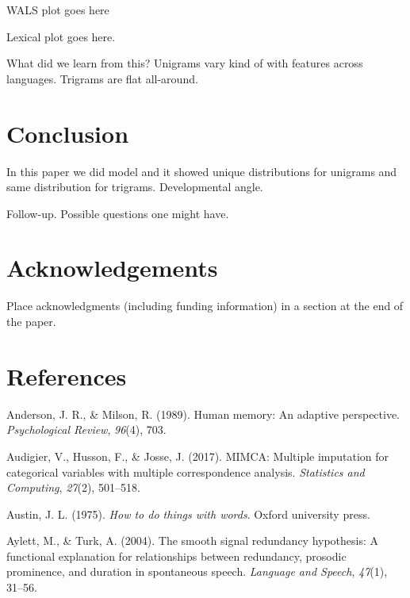 \documentclass[10pt, letterpaper]{article}
\begin{document}
WALS plot goes here

Lexical plot goes here.

What did we learn from this? Unigrams vary kind of with features across
languages. Trigrams are flat all-around.

\hypertarget{conclusion}{%
\section{Conclusion}\label{conclusion}}

In this paper we did model and it showed unique distributions for
unigrams and same distribution for trigrams. Developmental angle.

Follow-up. Possible questions one might have.

\hypertarget{acknowledgements}{%
\section{Acknowledgements}\label{acknowledgements}}

Place acknowledgments (including funding information) in a section at
the end of the paper.

\hypertarget{references}{%
\section{References}\label{references}}

\setlength{\parindent}{-0.1in} 
\setlength{\leftskip}{0.125in}

\noindent

\hypertarget{refs}{}
\leavevmode\hypertarget{ref-anderson1989}{}%
Anderson, J. R., \& Milson, R. (1989). Human memory: An adaptive
perspective. \emph{Psychological Review}, \emph{96}(4), 703.

\leavevmode\hypertarget{ref-audigier2017}{}%
Audigier, V., Husson, F., \& Josse, J. (2017). MIMCA: Multiple
imputation for categorical variables with multiple correspondence
analysis. \emph{Statistics and Computing}, \emph{27}(2), 501--518.

\leavevmode\hypertarget{ref-austin1975}{}%
Austin, J. L. (1975). \emph{How to do things with words}. Oxford
university press.

\leavevmode\hypertarget{ref-aylett2004}{}%
Aylett, M., \& Turk, A. (2004). The smooth signal redundancy hypothesis:
A functional explanation for relationships between redundancy, prosodic
prominence, and duration in spontaneous speech. \emph{Language and
Speech}, \emph{47}(1), 31--56.
\end{document}
